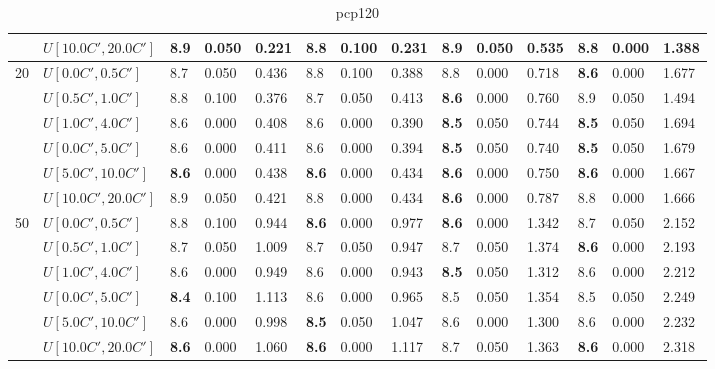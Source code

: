 \begin{table}[h]
{\begin{tabular}{|l|l||l|l|l||l|l|l||l|l|l||l|l|l|}
       & $U[10.0C',20.0C']$ & 8.9 & 0.050 & 0.221 & \textbf{8.8} & 0.100 & 0.231 & 8.9 & 0.050 & 0.535 & \textbf{8.8} & 0.000 & 1.388 \\
      \hline\hline
      \multirow{6}{*}{20} & $U[0.0C',0.5C']$ & 8.7 & 0.050 & 0.436 & 8.8 & 0.100 & 0.388 & 8.8 & 0.000 & 0.718 & \textbf{8.6} & 0.000 & 1.677 \\
       & $U[0.5C',1.0C']$ & 8.8 & 0.100 & 0.376 & 8.7 & 0.050 & 0.413 & \textbf{8.6} & 0.000 & 0.760 & 8.9 & 0.050 & 1.494 \\
       & $U[1.0C',4.0C']$ & 8.6 & 0.000 & 0.408 & 8.6 & 0.000 & 0.390 & \textbf{8.5} & 0.050 & 0.744 & \textbf{8.5} & 0.050 & 1.694 \\
       & $U[0.0C',5.0C']$ & 8.6 & 0.000 & 0.411 & 8.6 & 0.000 & 0.394 & \textbf{8.5} & 0.050 & 0.740 & \textbf{8.5} & 0.050 & 1.679 \\
       & $U[5.0C',10.0C']$ & \textbf{8.6} & 0.000 & 0.438 & \textbf{8.6} & 0.000 & 0.434 & \textbf{8.6} & 0.000 & 0.750 & \textbf{8.6} & 0.000 & 1.667 \\
       & $U[10.0C',20.0C']$ & 8.9 & 0.050 & 0.421 & 8.8 & 0.000 & 0.434 & \textbf{8.6} & 0.000 & 0.787 & 8.8 & 0.000 & 1.666 \\
      \hline\hline
      \multirow{6}{*}{50} & $U[0.0C',0.5C']$ & 8.8 & 0.100 & 0.944 & \textbf{8.6} & 0.000 & 0.977 & \textbf{8.6} & 0.000 & 1.342 & 8.7 & 0.050 & 2.152 \\
       & $U[0.5C',1.0C']$ & 8.7 & 0.050 & 1.009 & 8.7 & 0.050 & 0.947 & 8.7 & 0.050 & 1.374 & \textbf{8.6} & 0.000 & 2.193 \\
       & $U[1.0C',4.0C']$ & 8.6 & 0.000 & 0.949 & 8.6 & 0.000 & 0.943 & \textbf{8.5} & 0.050 & 1.312 & 8.6 & 0.000 & 2.212 \\
       & $U[0.0C',5.0C']$ & \textbf{8.4} & 0.100 & 1.113 & 8.6 & 0.000 & 0.965 & 8.5 & 0.050 & 1.354 & 8.5 & 0.050 & 2.249 \\
       & $U[5.0C',10.0C']$ & 8.6 & 0.000 & 0.998 & \textbf{8.5} & 0.050 & 1.047 & 8.6 & 0.000 & 1.300 & 8.6 & 0.000 & 2.232 \\
       & $U[10.0C',20.0C']$ & \textbf{8.6} & 0.000 & 1.060 & \textbf{8.6} & 0.000 & 1.117 & 8.7 & 0.050 & 1.363 & \textbf{8.6} & 0.000 & 2.318 \\
      \hline
      \end{tabular}
      }
      \caption{pcp120}
      \label{tab:pcp120}\end{table}
	
